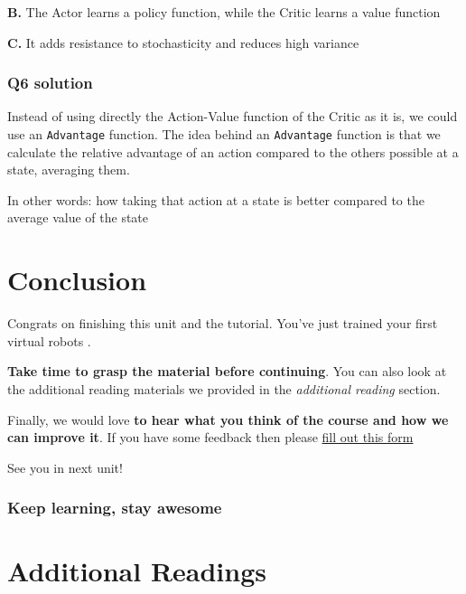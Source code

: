 \documentclass[11pt,a4paper]{article}
\begin{document}
\textbf{B.} The Actor learns a policy function, while the Critic learns a value function

\textbf{C.} It adds resistance to stochasticity and reduces high variance

\subsubsection{Q6 solution}\label{q6-solution}

Instead of using directly the Action-Value function of the Critic as it is, we could use an \texttt{Advantage} function. The idea behind an \texttt{Advantage} function is that we calculate the relative advantage of an action compared to the others possible at a state, averaging them.

In other words: how taking that action at a state is better compared to the average value of the state


\section{Conclusion}\label{conclusion}

Congrats on finishing this unit and the tutorial. You've just trained your first virtual robots .

\textbf{Take time to grasp the material before continuing}. You can also look at the additional reading materials we provided in the \emph{additional reading} section.

Finally, we would love \textbf{to hear what you think of the course and how we can improve it}. If you have some feedback then please \href{https://forms.gle/BzKXWzLAGZESGNaE9}{fill out this form}

See you in next unit!

\subsubsection{Keep learning, stay awesome}\label{keep-learning-stay-awesome-1}

\section{Additional Readings}\label{additional-readings}
\end{document}
